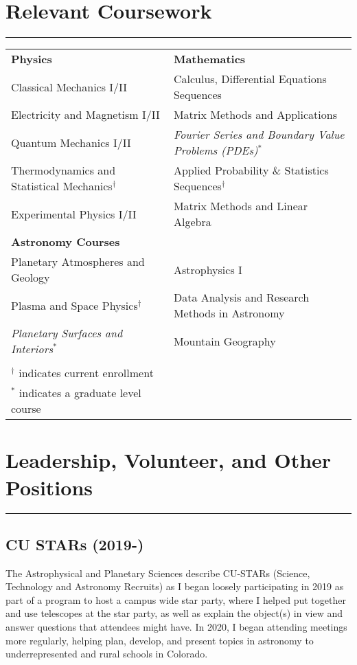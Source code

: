 \documentclass{article}
\newcommand{\divider}{\vskip-2pt\hrule\vskip4pt}
\begin{document}
\section{Relevant Coursework}
\divider
\begin{tabularx}{\textwidth}{
    @{\hspace{}}%
    >{\leavevmode\llap{}\raggedright}%
    X%
    @{\quad\hspace{2.5cm}}%
    >{\leavevmode\llap{}\raggedright\arraybackslash}%
    X%
    @{}%
  }
  \textbf{Physics} & \textbf{Mathematics} \\
  Classical Mechanics I/II & Calculus, Differential Equations Sequences\\
  Electricity and Magnetism I/II & Matrix Methods and Applications\\
  Quantum Mechanics I/II & \textit{Fourier Series and Boundary Value Problems (PDEs)}$^*$\\
  Thermodynamics and Statistical Mechanics$^\dagger$ & Applied Probability \& Statistics Sequences$^\dagger$\\
  Experimental Physics I/II & Matrix Methods and Linear Algebra\\
  \textbf{Astronomy Courses} & \\
  Planetary Atmospheres and Geology & Astrophysics I \\
  Plasma and Space Physics$^\dagger$  & Data Analysis and Research Methods in Astronomy  \\
  \textit{Planetary Surfaces and Interiors}$^*$ &  Mountain Geography\\
  \\
  $^\dagger$ indicates current enrollment \\
  $^*$ indicates a graduate level course
\end{tabularx}

\section{Leadership, Volunteer, and Other Positions}
\divider

\subsection{CU STARs (2019-)}
The Astrophysical and Planetary Sciences describe CU-STARs (Science, Technology and Astronomy Recruits) as  I began loosely participating in 2019 as part of a program to host a campus wide star party, where I helped put together and use telescopes at the star party, as well as explain the object(s) in view and answer questions that attendees might have. In 2020, I began attending meetings more regularly, helping plan, develop, and present topics in astronomy to underrepresented and rural schools in Colorado.
\end{document}
